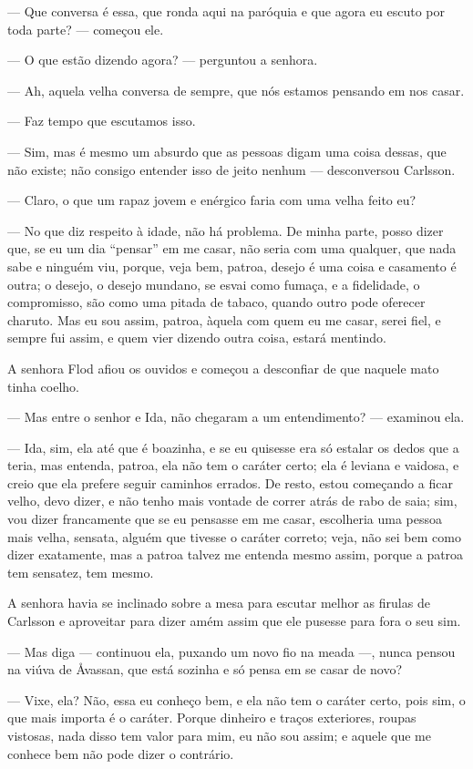 --- Que conversa é essa, que ronda aqui na paróquia e que agora eu escuto por
toda parte? --- começou ele.

--- O que estão dizendo agora? --- perguntou a senhora.

--- Ah, aquela velha conversa de sempre, que nós estamos pensando em nos casar.

--- Faz tempo que escutamos isso.

--- Sim, mas é mesmo um absurdo que as pessoas digam uma coisa dessas, que não
existe; não consigo entender isso de jeito nenhum --- desconversou Carlsson.

--- Claro, o que um rapaz jovem e enérgico faria com uma velha feito eu?

--- No que diz respeito à idade, não há problema. De minha parte, posso dizer que, se eu
um dia ``pensar'' em me casar, não seria com uma qualquer, que nada sabe e
ninguém viu, porque, veja bem, patroa, desejo é uma coisa e casamento é outra; o
desejo, o desejo mundano, se esvai como fumaça, e a fidelidade, o compromisso,
são como uma pitada de tabaco, quando outro pode oferecer charuto. Mas eu sou assim, 
patroa, àquela com quem eu me casar, serei fiel, e sempre fui assim, e quem
vier dizendo outra coisa, estará mentindo.

A senhora Flod afiou os ouvidos e começou a desconfiar de que naquele mato tinha coelho.

--- Mas entre o senhor e Ida, não chegaram a um entendimento? --- examinou ela.

--- Ida, sim, ela até que é boazinha, e se eu quisesse era só estalar os dedos que
a teria, mas entenda, patroa, ela não tem o caráter certo; ela é leviana e vaidosa,
e creio que ela prefere seguir caminhos errados. De resto, estou começando a
ficar velho, devo dizer, e não tenho mais vontade de correr atrás de rabo de
saia; sim, vou dizer francamente que se eu pensasse em me casar, escolheria uma
pessoa mais velha, sensata, alguém que tivesse o caráter correto; veja, não sei
bem como dizer exatamente, mas a patroa talvez me entenda mesmo assim, porque a patroa
tem sensatez, tem mesmo.

A senhora havia se inclinado sobre a mesa para escutar melhor as firulas de
Carlsson e aproveitar para dizer amém assim que ele pusesse para fora o seu sim.

--- Mas diga --- continuou ela, puxando um novo fio na meada ---, nunca pensou na
viúva de Åvassan, que está sozinha e só pensa em se casar de novo?

--- Vixe, ela? Não, essa eu conheço bem, e ela não tem o caráter certo, pois
sim, o que mais importa é o caráter. Porque dinheiro e traços exteriores, roupas
vistosas, nada disso tem valor para mim, eu não sou assim; e aquele que me
conhece bem não pode dizer o contrário.

